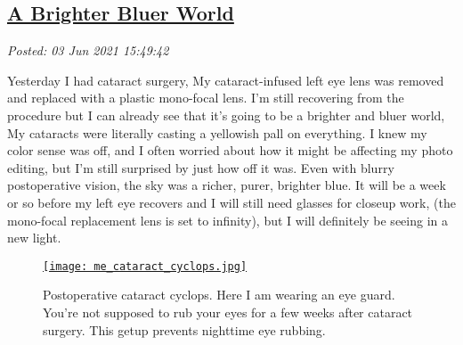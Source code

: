 %

\subsection*{\href{http://analyzethedatanotthedrivel.org/2021/06/03/a-brighter-bluer-world/}{A Brighter Bluer World}}


\noindent\emph{Posted: 03 Jun 2021 15:49:42}
\vspace{6pt}

Yesterday I had cataract surgery, My cataract-infused left eye lens was
removed and replaced with a plastic mono-focal lens. I'm still
recovering from the procedure but I can already see that it's going to
be a brighter and bluer world, My cataracts were literally casting a
yellowish pall on everything. I knew my color sense was off, and I often
worried about how it might be affecting my photo editing, but I'm still
surprised by just how off it was. Even with blurry postoperative vision,
the sky was a richer, purer, brighter blue. It will be a week or so
before my left eye recovers and I will still need glasses for closeup
work, (the mono-focal replacement lens is set to infinity), but I will
definitely be seeing in a new light.



\captionsetup[figure]{labelformat=empty}
\begin{SCfigure}[50]
\centering
\href{https://conceptcontrol.smugmug.com/Themes/Diaries/Cell-Phoning-It-In/i-HvF59SL/A}{\texttt{[image: me\_cataract\_cyclops.jpg]}}
\caption[Postoperative cataract cyclops]{Postoperative cataract cyclops. Here I am wearing an eye guard.
You're not supposed to rub your eyes for a few weeks after cataract
surgery. This getup prevents nighttime eye rubbing.}
\label{fig:7086x0}
\end{SCfigure}





%
 
